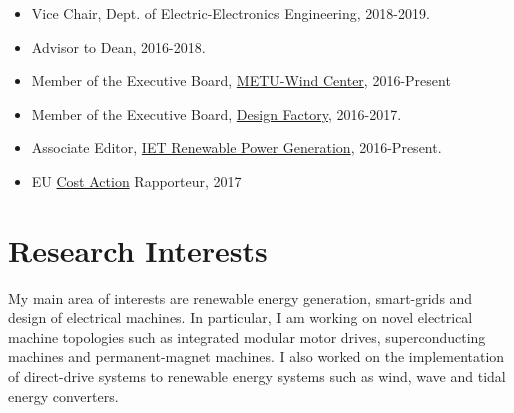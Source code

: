 \documentclass[a4paper,12pt]{article}
\begin{document}
\begin{itemize}

\item Vice Chair, Dept. of Electric-Electronics Engineering, 2018-2019.
\item Advisor to Dean, 2016-2018.
\item Member of the Executive Board, \href{http://ruzgem.metu.edu.tr/}{METU-Wind Center}, 2016-Present
\item Member of the Executive Board, \href{http://tdi.metu.edu.tr}{Design Factory}, 2016-2017.
\item Associate Editor, \href{http://digital-library.theiet.org/content/journals/iet-rpg}{IET Renewable Power Generation}, 2016-Present.
\item EU \href{http://www.cost.eu/}{Cost Action} Rapporteur, 2017

\end{itemize}

\section{Research Interests}

My main area of interests are renewable energy generation, smart-grids and design of electrical machines. In particular, I am working on novel electrical machine topologies such as integrated modular motor drives, superconducting machines and permanent-magnet machines. I also worked on the implementation of direct-drive systems to renewable energy systems such as wind, wave and tidal energy converters.

\clearpage
\end{document}
